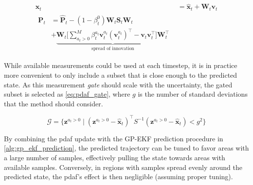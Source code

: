 \begin{subequations}
    \begin{align}
        \boldsymbol{x}_t & = \hat{\boldsymbol{x}}_t + \boldsymbol{W}_t \boldsymbol{v}_t \label{eq:pdaf_moment_mean} \\
        \begin{split}
            \boldsymbol{P}_t &= \hat{\boldsymbol{P}}_t - (1 - \beta_t^{0}) \boldsymbol{W}_t \boldsymbol{S}_t  \boldsymbol{W}_t\\ &+ \underbrace{\boldsymbol{W}_t \big[\sum_{a_t > 0}^M \beta_t^{a_t} \boldsymbol{v}_t^{a_t} (\boldsymbol{v}_t^{a_t})^\intercal - \boldsymbol{v}_t \boldsymbol{v}_t^\intercal \big] \boldsymbol{W}_t^\intercal}_{\text{spread of innovation}}\label{eq:pdaf_moment_var}
        \end{split}
    \end{align}
\end{subequations}

While available measurements could be used at each timestep, it is in practice more convenient to only include a subset that is close enough to the predicted state. As this measurement \textit{gate} should scale with the uncertainty, the gated subset is selected as \cref{eq:pdaf_gate}, where $g$ is the number of standard deviations that the method should consider.

\begin{equation} \label{eq:pdaf_gate}
    \mathcal{G} = \big\{ \boldsymbol{z}^{a_t > 0} \; | \; (\boldsymbol{z}^{a_t > 0} - \hat{\boldsymbol{x}}_t)^\intercal S^{-1} (\boldsymbol{z}^{a_t > 0} - \hat{\boldsymbol{x}}_t) < g^2 \big\}
\end{equation}


By combining the \acrshort{pdaf} update with the GP-EKF prediction procedure in \cref{alg:gp_ekf_prediction}, the predicted trajectory can be tuned to favor areas with a large number of samples, effectively pulling the state towards areas with available samples. Conversely, in regions with samples spread evenly around the predicted state, the \acrshort{pdaf}'s effect is then negligible (assuming proper tuning). 

